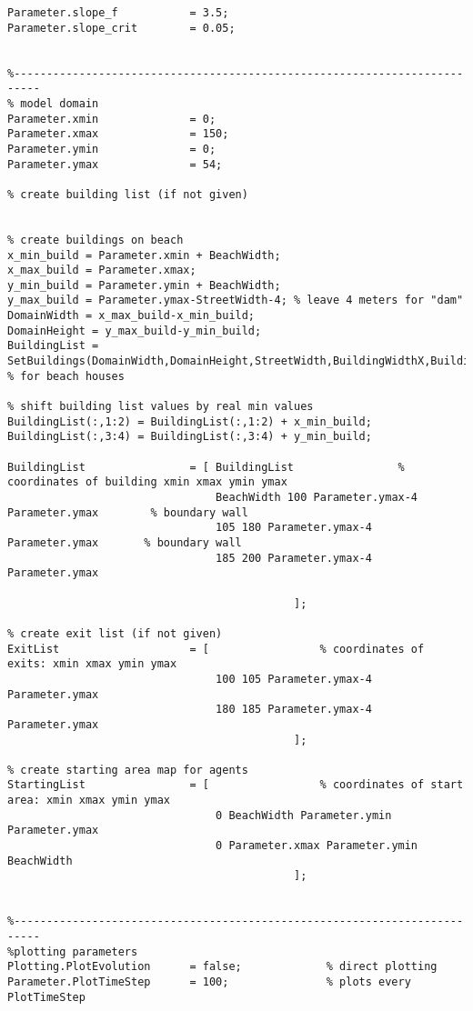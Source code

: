 \begin{lstlisting}[breaklines]
% parameters for slope-dependent velocity
Parameter.slope_f           = 3.5;
Parameter.slope_crit        = 0.05;


%--------------------------------------------------------------------------
% model domain
Parameter.xmin              = 0;
Parameter.xmax              = 150;
Parameter.ymin              = 0;
Parameter.ymax              = 54;

% create building list (if not given)


% create buildings on beach
x_min_build = Parameter.xmin + BeachWidth;
x_max_build = Parameter.xmax;
y_min_build = Parameter.ymin + BeachWidth;
y_max_build = Parameter.ymax-StreetWidth-4; % leave 4 meters for "dam"
DomainWidth = x_max_build-x_min_build;
DomainHeight = y_max_build-y_min_build;
BuildingList = SetBuildings(DomainWidth,DomainHeight,StreetWidth,BuildingWidthX,BuildingWidthY); % for beach houses

% shift building list values by real min values
BuildingList(:,1:2) = BuildingList(:,1:2) + x_min_build;
BuildingList(:,3:4) = BuildingList(:,3:4) + y_min_build;

BuildingList                = [ BuildingList                % coordinates of building xmin xmax ymin ymax
                                BeachWidth 100 Parameter.ymax-4 Parameter.ymax        % boundary wall
                                105 180 Parameter.ymax-4 Parameter.ymax       % boundary wall
                                185 200 Parameter.ymax-4 Parameter.ymax
                                
                                            ];
        
% create exit list (if not given)
ExitList                    = [                 % coordinates of exits: xmin xmax ymin ymax
                                100 105 Parameter.ymax-4 Parameter.ymax
                                180 185 Parameter.ymax-4 Parameter.ymax
                                            ];
       
% create starting area map for agents
StartingList                = [             	% coordinates of start area: xmin xmax ymin ymax
                                0 BeachWidth Parameter.ymin Parameter.ymax
                                0 Parameter.xmax Parameter.ymin BeachWidth
                                            ];
       
                                        
%--------------------------------------------------------------------------
%plotting parameters
Plotting.PlotEvolution      = false;             % direct plotting
Parameter.PlotTimeStep      = 100;               % plots every PlotTimeStep


\end{lstlisting}
